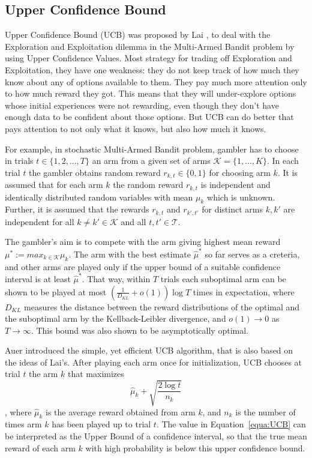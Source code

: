 \subsection{Upper Confidence Bound}
\label{subsec:ucb}
Upper Confidence Bound (UCB) was proposed by Lai \cite{lai1985asymptotically}, to deal with the Exploration and Exploitation dilemma in the Multi-Armed Bandit problem by using Upper Confidence Values. Most strategy for trading off Exploration and Exploitation, they have one weakness: they do not keep track of how much they know about any of options available to them. They pay much more attention only to how much reward they got. This means that they will under-explore options whose initial experiences were not rewarding, even though they don't have enough data to be confident about those options. But UCB can do better that pays attention to not only what it knows, but also how much it knows. 

For example, in stochastic Multi-Armed Bandit problem, gambler has to choose in trials $t\in \{1,2,\dots,T\}$ an arm from a given set of arms $\mathscr{K} = \{1,\dots,K\}$. 
In each trial $t$ the gambler obtains random reward $r_{k,t}\in \{0,1\}$ for choosing arm $k$. 
It is assumed that for each arm $k$ the random reward $r_{k,t}$ is independent and identically distributed random variables with mean $\mu_k$ which is unknown. 
Further, it is assumed that the rewards $r_{k,t}$ and $r_{k',t'}$ for distinct arms $k,k'$ are independent for all $k\neq k' \in \mathscr{K}$ and all $t, t' \in \mathscr{T}$.
 
The gambler's aim is to compete with the arm giving highest mean reward $\mu^{\ast}:= max_{k\in \mathscr{K}} \mu_k$. The arm with the best estimate $\hat{\mu}^{\ast}$ so far serves as a creteria, and other arms are played only if the upper bound of a suitable confidence interval is at least $\hat{\mu}^{\ast}$. That way, within $T$ trials each suboptimal arm can be shown to be played at most $\left(\frac{1}{D_{KL}}+o(1)\right)\log{T}$ times in expectation, where $D_{KL}$ measures the distance between the reward distributions of the optimal and the suboptimal arm by the Kellback-Leibler divergence, and $o(1) \rightarrow 0$ as $T \rightarrow \infty$. This bound was also shown to be asymptotically optimal\cite{lai1985asymptotically}.

Auer \cite{auer2003using} introduced the simple, yet efficient UCB algorithm, that is also based on the ideas of Lai's. After playing each arm once for initialization, UCB chooses at trial $t$ the arm $k$ that maximizes
\begin{equation}
\label{equa:UCB}
\hat{\mu}_k+\sqrt{\frac{2\log{t}}{n_k}}
\end{equation},
where $\hat{\mu}_k$ is the average reward obtained from arm $k$, and $n_k$ is the number of times arm $k$ has been played up to trial $t$. The value in Equation~\ref{equa:UCB} can be interpreted as the Upper Bound of a confidence interval, so that the true mean reward of each arm $k$ with high probability is below this upper confidence bound.

